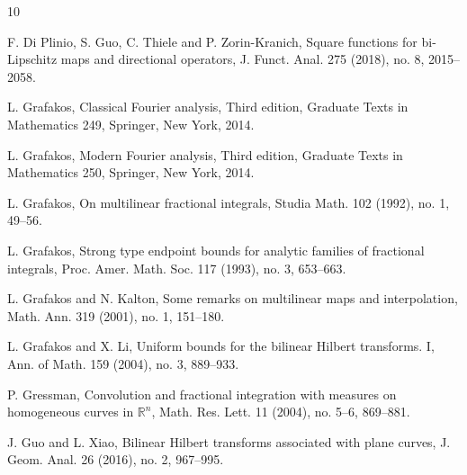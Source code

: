 \documentclass[11pt, twoside, leqno]{article}
\theoremstyle{definition}
\numberwithin{equation}{section}
\begin{document}
\begin{thebibliography}{10}
\vspace{-.3cm}

 F. Di Plinio, S. Guo, C. Thiele and P. Zorin-Kranich, Square functions for bi-Lipschitz maps and directional operators, J. Funct. Anal. 275 (2018), no. 8, 2015--2058.

\vspace{-.3cm}

 L. Grafakos, Classical Fourier analysis, Third edition, Graduate Texts in Mathematics 249, Springer, New York, 2014.

\vspace{-.3cm}

 L. Grafakos, Modern Fourier analysis, Third edition, Graduate Texts in Mathematics 250, Springer, New York, 2014.

\vspace{-.3cm}

 L. Grafakos, On multilinear fractional integrals, Studia Math. 102 (1992), no. 1, 49--56.

\vspace{-.3cm}

 L. Grafakos, Strong type endpoint bounds for analytic families of fractional integrals, Proc. Amer. Math. Soc. 117 (1993), no. 3, 653--663.

\vspace{-.3cm}

 L. Grafakos and N. Kalton, Some remarks on multilinear maps and interpolation, Math. Ann. 319 (2001), no. 1, 151--180.

\vspace{-.3cm}

 L. Grafakos and X. Li, Uniform bounds for the bilinear Hilbert transforms. I, Ann. of Math. 159 (2004), no. 3, 889--933.

\vspace{-.3cm}

 P. Gressman, Convolution and fractional integration with measures on homogeneous curves in ${\mathbb R}^{n}$, Math. Res. Lett. 11 (2004), no. 5--6, 869--881.

\vspace{-.3cm}

 J. Guo and L. Xiao, Bilinear Hilbert transforms associated with plane curves, J. Geom. Anal. 26 (2016), no. 2, 967--995.

\vspace{-.3cm}


\end{thebibliography}
\end{document}
